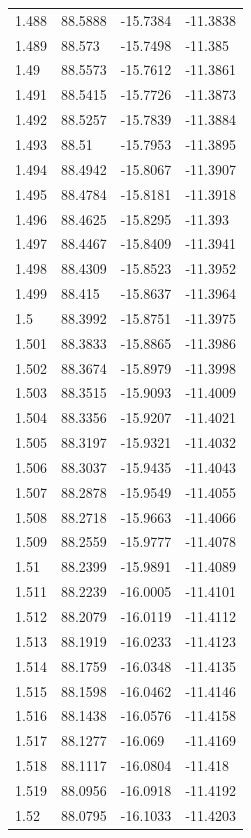 \begin{tabular}{llll}
1.488 & 88.5888 & -15.7384 & -11.3838 \\
1.489 & 88.573 & -15.7498 & -11.385 \\
1.49 & 88.5573 & -15.7612 & -11.3861 \\
1.491 & 88.5415 & -15.7726 & -11.3873 \\
1.492 & 88.5257 & -15.7839 & -11.3884 \\
1.493 & 88.51 & -15.7953 & -11.3895 \\
1.494 & 88.4942 & -15.8067 & -11.3907 \\
1.495 & 88.4784 & -15.8181 & -11.3918 \\
1.496 & 88.4625 & -15.8295 & -11.393 \\
1.497 & 88.4467 & -15.8409 & -11.3941 \\
1.498 & 88.4309 & -15.8523 & -11.3952 \\
1.499 & 88.415 & -15.8637 & -11.3964 \\
1.5 & 88.3992 & -15.8751 & -11.3975 \\
1.501 & 88.3833 & -15.8865 & -11.3986 \\
1.502 & 88.3674 & -15.8979 & -11.3998 \\
1.503 & 88.3515 & -15.9093 & -11.4009 \\
1.504 & 88.3356 & -15.9207 & -11.4021 \\
1.505 & 88.3197 & -15.9321 & -11.4032 \\
1.506 & 88.3037 & -15.9435 & -11.4043 \\
1.507 & 88.2878 & -15.9549 & -11.4055 \\
1.508 & 88.2718 & -15.9663 & -11.4066 \\
1.509 & 88.2559 & -15.9777 & -11.4078 \\
1.51 & 88.2399 & -15.9891 & -11.4089 \\
1.511 & 88.2239 & -16.0005 & -11.4101 \\
1.512 & 88.2079 & -16.0119 & -11.4112 \\
1.513 & 88.1919 & -16.0233 & -11.4123 \\
1.514 & 88.1759 & -16.0348 & -11.4135 \\
1.515 & 88.1598 & -16.0462 & -11.4146 \\
1.516 & 88.1438 & -16.0576 & -11.4158 \\
1.517 & 88.1277 & -16.069 & -11.4169 \\
1.518 & 88.1117 & -16.0804 & -11.418 \\
1.519 & 88.0956 & -16.0918 & -11.4192 \\
1.52 & 88.0795 & -16.1033 & -11.4203 \\

\end{tabular}
